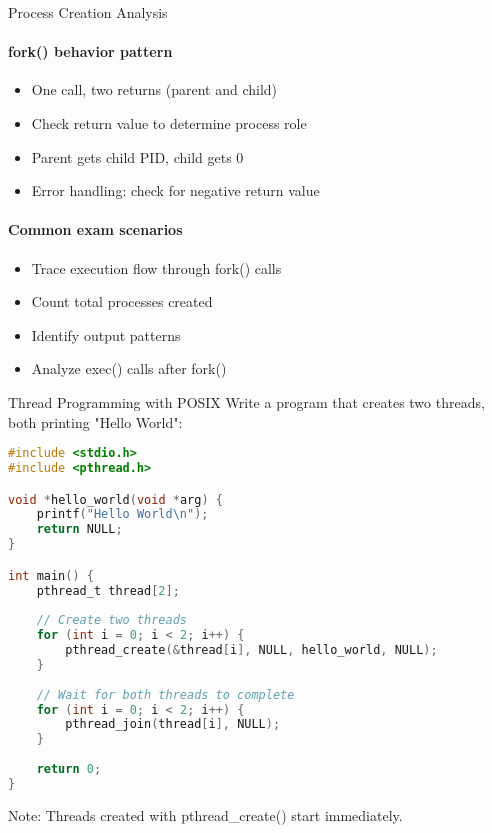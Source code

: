 \begin{KR}{Process Creation Analysis}
    \paragraph{fork() behavior pattern}
    \begin{itemize}
        \item One call, two returns (parent and child)
        \item Check return value to determine process role
        \item Parent gets child PID, child gets 0
        \item Error handling: check for negative return value
    \end{itemize}
    
    \paragraph{Common exam scenarios}
    \begin{itemize}
        \item Trace execution flow through fork() calls
        \item Count total processes created
        \item Identify output patterns
        \item Analyze exec() calls after fork()
    \end{itemize}
\end{KR}

\begin{example2}{Thread Programming with POSIX}
    Write a program that creates two threads, both printing "Hello World":
    
    \tcblower
    
\begin{lstlisting}[language=C, style=basesmol]
#include <stdio.h>
#include <pthread.h>

void *hello_world(void *arg) {
    printf("Hello World\n");
    return NULL;
}

int main() {
    pthread_t thread[2];
    
    // Create two threads
    for (int i = 0; i < 2; i++) {
        pthread_create(&thread[i], NULL, hello_world, NULL);
    }
    
    // Wait for both threads to complete
    for (int i = 0; i < 2; i++) {
        pthread_join(thread[i], NULL);
    }
    
    return 0;
}
\end{lstlisting}

    Note: Threads created with pthread\_create() start immediately.
\end{example2}

